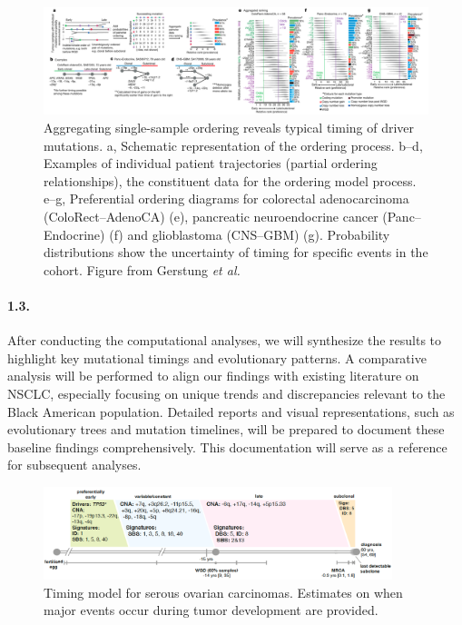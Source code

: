 \begin{figure}[h] %
  \centering
  \begin{mdframed}
  \includegraphics[width=7.4in]{./Figures/driver_mutations_timing.png}
  \caption{Aggregating single-sample ordering reveals typical timing of driver mutations. 
  a, Schematic representation of the ordering process. 
  b–d, Examples of individual patient trajectories (partial ordering relationships), the constituent data for the ordering model process. 
  e–g, Preferential ordering diagrams for colorectal adenocarcinoma (ColoRect–AdenoCA) (e), pancreatic neuroendocrine cancer (Panc–Endocrine) (f) and glioblastoma (CNS–GBM) (g). 
  Probability distributions show the uncertainty of timing for specific events in the cohort.
  Figure from Gerstung \textit{et al.}}
  \label{driver_mutations}
  \end{mdframed}
\end{figure}

\paragraph{1.3. \SpecificAimOneC}

After conducting the computational analyses, we will synthesize the results to highlight key mutational timings and evolutionary patterns. 
A comparative analysis will be performed to align our findings with existing literature on NSCLC, 
especially focusing on unique trends and discrepancies relevant to the Black American population. 
Detailed reports and visual representations, such as evolutionary trees and mutation timelines, 
will be prepared to document these baseline findings comprehensively. 
This documentation will serve as a reference for subsequent analyses.

\begin{figure}
  \begin{mdframed}
  \includegraphics[width=4.0in]{./Figures/evolution-map.png}
  \caption{Timing model for serous ovarian carcinomas. 
  			Estimates on when major events occur during tumor development are provided.~\cite{gerstung_evolutionary_2020}}
  \label{timeline}
  \end{mdframed}
\end{figure}

